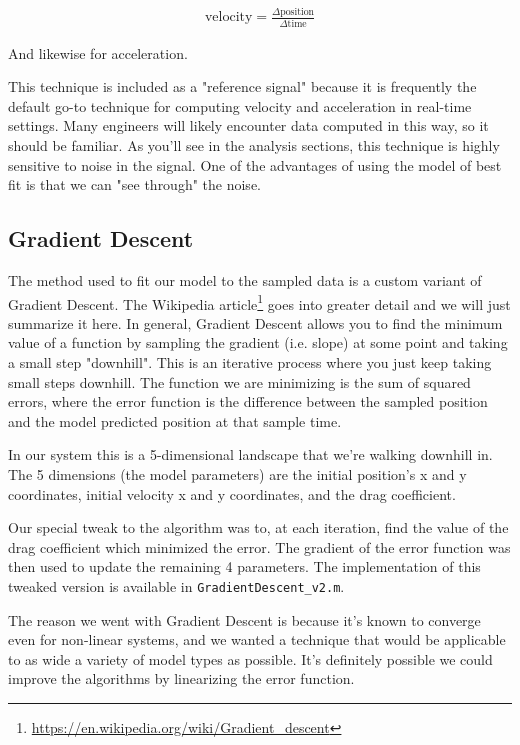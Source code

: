 \begin{align*}
\text{velocity} = \frac{\Delta \text{position}}{\Delta \text{time}}
\end{align*}

And likewise for acceleration. 

This technique is included as a "reference signal" because it is frequently the default go-to technique for computing velocity and acceleration in real-time settings. Many engineers will likely encounter data computed in this way, so it should be familiar. As you'll see in the analysis sections, this technique is highly sensitive to noise in the signal. One of the advantages of using the model of best fit is that we can "see through" the noise.

\subsection{Gradient Descent}
The method used to fit our model to the sampled data is a custom variant of Gradient Descent. The Wikipedia article\footnote{\href{https://en.wikipedia.org/wiki/Gradient\_descent}{https://en.wikipedia.org/wiki/Gradient\_descent}} goes into greater detail and we will just summarize it here. In general, Gradient Descent allows you to find the minimum value of a function by sampling the gradient (i.e. slope) at some point and taking a small step "downhill". This is an iterative process where you just keep taking small steps downhill. The function we are minimizing is the sum of squared errors, where the error function is the difference between the sampled position and the model predicted position at that sample time. 

In our system this is a 5-dimensional landscape that we're walking downhill in. The 5 dimensions (the model parameters) are the initial position's x and y coordinates, initial velocity x and y coordinates, and the drag coefficient. 

Our special tweak to the algorithm was to, at each iteration, find the value of the drag coefficient which minimized the error. The gradient of the error function was then used to update the remaining 4 parameters. The implementation of this tweaked version is available in \texttt{GradientDescent\_v2.m}.

The reason we went with Gradient Descent is because it's known to converge even for non-linear systems, and we wanted a technique that would be applicable to as wide a variety of model types as possible. It's definitely possible we could improve the algorithms by linearizing the error function. 
